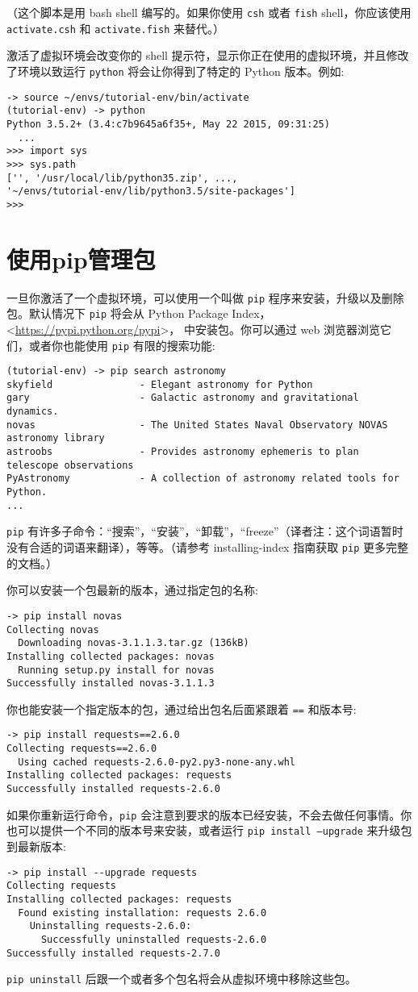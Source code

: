 （这个脚本是用 bash shell 编写的。如果你使用 \texttt{csh} 或者 \texttt{fish} shell，你应该使用 \texttt{activate.csh} 和 \texttt{activate.fish} 来替代。）

激活了虚拟环境会改变你的 shell 提示符，显示你正在使用的虚拟环境，并且修改了环境以致运行 \texttt{python} 将会让你得到了特定的 Python 版本。例如:
\begin{lstlisting}
-> source ~/envs/tutorial-env/bin/activate
(tutorial-env) -> python
Python 3.5.2+ (3.4:c7b9645a6f35+, May 22 2015, 09:31:25)
  ...
>>> import sys
>>> sys.path
['', '/usr/local/lib/python35.zip', ...,
'~/envs/tutorial-env/lib/python3.5/site-packages']
>>>
\end{lstlisting}
\section{使用pip管理包}
一旦你激活了一个虚拟环境，可以使用一个叫做 \texttt{pip} 程序来安装，升级以及删除包。默认情况下 \texttt{pip} 将会从 Python Package Index，\textless \url{https://pypi.python.org/pypi}\textgreater， 中安装包。你可以通过 web 浏览器浏览它们，或者你也能使用 \texttt{pip} 有限的搜索功能:
\begin{lstlisting}
(tutorial-env) -> pip search astronomy
skyfield               - Elegant astronomy for Python
gary                   - Galactic astronomy and gravitational dynamics.
novas                  - The United States Naval Observatory NOVAS astronomy library
astroobs               - Provides astronomy ephemeris to plan telescope observations
PyAstronomy            - A collection of astronomy related tools for Python.
...
\end{lstlisting}
\texttt{pip} 有许多子命令：“搜索”，“安装”，“卸载”，“freeze”（译者注：这个词语暂时没有合适的词语来翻译），等等。（请参考 installing-index 指南获取 \texttt{pip} 更多完整的文档。）

你可以安装一个包最新的版本，通过指定包的名称:
\begin{Verbatim}[fontfamily=tt]
-> pip install novas
Collecting novas
  Downloading novas-3.1.1.3.tar.gz (136kB)
Installing collected packages: novas
  Running setup.py install for novas
Successfully installed novas-3.1.1.3
\end{Verbatim}
你也能安装一个指定版本的包，通过给出包名后面紧跟着 \verb|==| 和版本号:
\begin{Verbatim}[fontfamily=tt]
-> pip install requests==2.6.0
Collecting requests==2.6.0
  Using cached requests-2.6.0-py2.py3-none-any.whl
Installing collected packages: requests
Successfully installed requests-2.6.0
\end{Verbatim}
如果你重新运行命令，\texttt{pip} 会注意到要求的版本已经安装，不会去做任何事情。你也可以提供一个不同的版本号来安装，或者运行 \texttt{pip install --upgrade} 来升级包到最新版本:
\begin{Verbatim}[fontfamily=tt]
-> pip install --upgrade requests
Collecting requests
Installing collected packages: requests
  Found existing installation: requests 2.6.0
    Uninstalling requests-2.6.0:
      Successfully uninstalled requests-2.6.0
Successfully installed requests-2.7.0
\end{Verbatim}
\texttt{pip uninstall} 后跟一个或者多个包名将会从虚拟环境中移除这些包。

